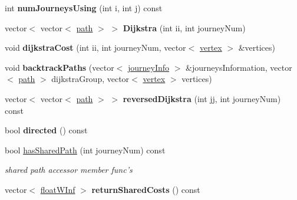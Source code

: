 \begin{DoxyCompactItemize}
\item 
\hypertarget{classgraphGroup_afb29312001efbe25fb6ef4fa2284374c}{
int {\bfseries numJourneysUsing} (int i, int j) const }
\label{classgraphGroup_afb29312001efbe25fb6ef4fa2284374c}

\item 
\hypertarget{classgraphGroup_a1d4ed85b6f51dec079b10d144a396fb9}{
vector$<$ vector$<$ \hyperlink{classpath}{path} $>$ $>$ {\bfseries Dijkstra} (int ii, int journeyNum)}
\label{classgraphGroup_a1d4ed85b6f51dec079b10d144a396fb9}

\item 
\hypertarget{classgraphGroup_a379f0bcc30cfebc167f2c96cf93b4e06}{
void {\bfseries dijkstraCost} (int ii, int journeyNum, vector$<$ \hyperlink{classvertex}{vertex} $>$ \&vertices)}
\label{classgraphGroup_a379f0bcc30cfebc167f2c96cf93b4e06}

\item 
\hypertarget{classgraphGroup_a848c6a83c5a218246f9274717fc95d75}{
void {\bfseries backtrackPaths} (vector$<$ \hyperlink{classjourneyInfo}{journeyInfo} $>$ \&journeysInformation, vector$<$ \hyperlink{classpath}{path} $>$ dijkstraGroup, vector$<$ \hyperlink{classvertex}{vertex} $>$ vertices)}
\label{classgraphGroup_a848c6a83c5a218246f9274717fc95d75}

\item 
\hypertarget{classgraphGroup_a9b411bbaf32787d4c44434d4b086018e}{
vector$<$ vector$<$ \hyperlink{classpath}{path} $>$ $>$ {\bfseries reversedDijkstra} (int jj, int journeyNum) const }
\label{classgraphGroup_a9b411bbaf32787d4c44434d4b086018e}

\item 
\hypertarget{classgraphGroup_aa3c98cec01029b93fb9514743e07be00}{
bool {\bfseries directed} () const }
\label{classgraphGroup_aa3c98cec01029b93fb9514743e07be00}

\item 
\hypertarget{classgraphGroup_a78cff3ffb649edd43fe7a0b85fdb5c2f}{
bool \hyperlink{classgraphGroup_a78cff3ffb649edd43fe7a0b85fdb5c2f}{hasSharedPath} (int journeyNum) const }
\label{classgraphGroup_a78cff3ffb649edd43fe7a0b85fdb5c2f}

\begin{DoxyCompactList}\small\item\em shared path accessor member func's \end{DoxyCompactList}\item 
\hypertarget{classgraphGroup_a4ecf073073c04223e24166e88671f3a6}{
vector$<$ \hyperlink{classfloatWInf}{floatWInf} $>$ {\bfseries returnSharedCosts} () const }
\label{classgraphGroup_a4ecf073073c04223e24166e88671f3a6}


\end{DoxyCompactItemize}
